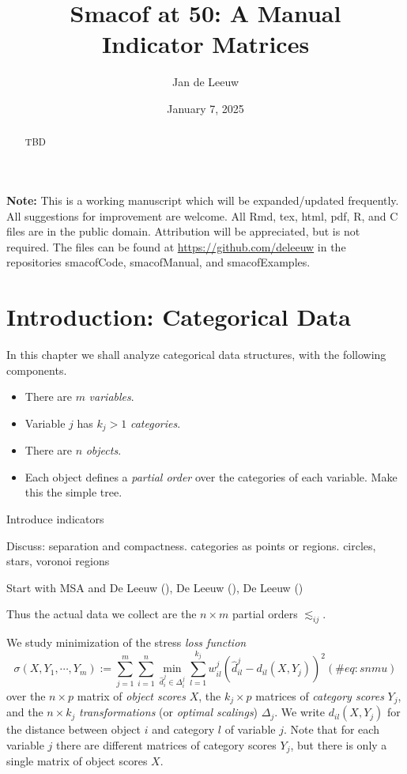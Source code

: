 \documentclass[
  12pt,
  letterpaper,
  DIV=11,
  numbers=noendperiod]{scrartcl}
\title{Smacof at 50: A Manual\\
Indicator Matrices}
\author{Jan de Leeuw}
\date{January 7, 2025}
\providecommand{\tightlist}{%
  \setlength{\itemsep}{0pt}\setlength{\parskip}{0pt}}\usepackage{longtable,booktabs,array}
\renewcommand*\contentsname{Table of contents}
\newcommand\contentsname{Table of contents}
\begin{document}
\maketitle
\begin{abstract}
TBD
\end{abstract}

\renewcommand*\contentsname{Table of contents}
{
\hypersetup{linkcolor=}
\setcounter{tocdepth}{3}
\tableofcontents
}

\textbf{Note:} This is a working manuscript which will be
expanded/updated frequently. All suggestions for improvement are
welcome. All Rmd, tex, html, pdf, R, and C files are in the public
domain. Attribution will be appreciated, but is not required. The files
can be found at \url{https://github.com/deleeuw} in the repositories
smacofCode, smacofManual, and smacofExamples.

\section{Introduction: Categorical Data}\label{cat}

In this chapter we shall analyze categorical data structures, with the
following components.

\begin{itemize}
\tightlist
\item
  There are \(m\) \emph{variables}.
\item
  Variable \(j\) has \(k_j>1\) \emph{categories}.
\item
  There are \(n\) \emph{objects}.
\item
  Each object defines a \emph{partial order} over the categories of each
  variable. Make this the simple tree.
\end{itemize}

Introduce indicators

Discuss: separation and compactness. categories as points or regions.
circles, stars, voronoi regions

Start with MSA and De Leeuw (), De
Leeuw (), De Leeuw
()

Thus the actual data we collect are the \(n\times m\) partial orders
\(\lesssim_{ij}\).

We study minimization of the stress \emph{loss function}
\begin{equation}
\sigma(X,Y_1,\cdots,Y_m):=\sum_{j=1}^m\sum_{i=1}^n\min_{\hat d_i^j\in\Delta_i^j}\sum_{l=1}^{k_j}w_{il}^j(\hat d_{il}^j-d_{il}(X,Y_j))^2
(\#eq:snmu)
\end{equation} over the \(n\times p\) matrix of \emph{object scores}
\(X\), the \(k_j\times p\) matrices of \emph{category scores} \(Y_j\),
and the \(n\times k_j\) \emph{transformations} (or \emph{optimal
scalings}) \(\Delta_j\). We write \(d_{il}(X,Y_j)\) for the distance
between object \(i\) and category \(l\) of variable \(j\). Note that for
each variable \(j\) there are different matrices of category scores
\(Y_j\), but there is only a single matrix of object scores \(X\).
\end{document}
